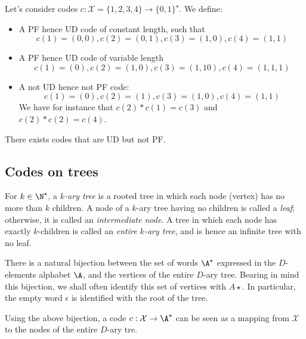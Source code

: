 \documentclass{../cs-classes/cs-classes}
\newcommand*{\X}{\mathcal{X}}
\begin{document}
\begin{example}
    Let's consider codes $c: \X=\{1, 2, 3, 4\} \to \{0, 1\}^\star$. We define:
    \begin{itemize}
        \item A PF hence UD code of constant length, such that
        \begin{equation*}
            c(1) = (0, 0), c(2) = (0, 1), c(3) = (1, 0), c(4) = (1, 1)
        \end{equation*}
        \item A PF hence UD code of variable length
        \begin{equation*}
            c(1) = (0), c(2) = (1, 0), c(3) = (1, 1 0), c(4) = (1, 1, 1)
        \end{equation*}
        \item A not UD hence not PF code:
        \begin{equation*}
            c(1) = (0), c(2) = (1), c(3) = (1, 0), c(4) = (1, 1)
        \end{equation*}
        We have for instance that $c(2)*c(1)=c(3)$ and $c(2)*c(2)=c(4)$.
    \end{itemize}
\end{example}

\begin{property}
    There exists codes that are UD but not PF.
\end{property}

\subsection{Codes on trees}
\begin{definition}
    For $k\in\N^\star$, a \emph{$k$-ary tree} is a rooted tree in which each node (vertex) has no more than $k$ children. A node of a $k$-ary tree having no children is called a \emph{leaf}; otherwise, it is called an \emph{intermediate node}. A tree in which each node has exactly $k$-children is called an \emph{entire $k$-ary tree}, and is hence an infinite tree with no leaf.
\end{definition}

\begin{remark}
    There is a natural bijection between the set of words $\A^\star$ expressed in the $D$-elements alphabet $\A$, and the vertices of the entire $D$-ary tree. Bearing in mind this bijection, we shall often identify this set of vertices with $A\star$. In particular, the empty word $\epsilon$ is identified with the root of the tree.

    Using the above bijection, a code $c:\X\to\A^\star$ can be seen as a mapping from $\X$ to the nodes of the entire $D$-ary tre.
\end{remark}
\end{document}

